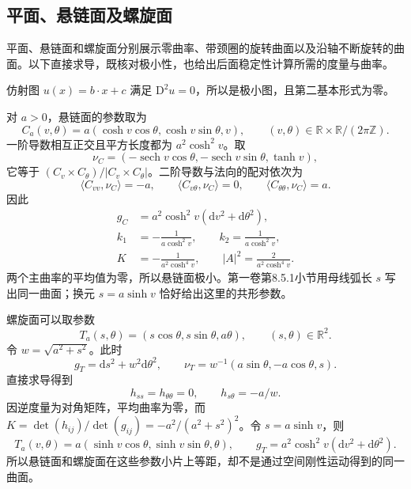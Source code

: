 \subsection{平面、悬链面及螺旋面}
\label{g3:subsec:1902:03}
平面、悬链面和螺旋面分别展示零曲率、带颈圈的旋转曲面以及沿轴不断旋转的曲面。以下直接求导，既核对极小性，也给出后面稳定性计算所需的度量与曲率。

\begin{example}\label{g3:exm:minimal-plane-catenoid-helicoid}
	仿射图 \(u(x)=b\cdot x+c\) 满足 \(\mathrm D^2u=0\)，所以是极小图，且第二基本形式为零。

	对 \(a>0\)，悬链面的参数取为
	\begin{equation}\label{g3:eq:catenoid-conformal-model}
		C_a(v,\theta)
		=a(\cosh v\cos\theta,\cosh v\sin\theta,v),
		\qquad(v,\theta)\in\mathbb R\times\mathbb R/(2\pi\mathbb Z).
	\end{equation}
	一阶导数相互正交且平方长度都为 \(a^2\cosh^2v\)。取
	\[
		\nu_C=(-\operatorname{sech}v\cos\theta,
		-\operatorname{sech}v\sin\theta,\tanh v),
	\]
	它等于 \((C_v\times C_\theta)/|C_v\times C_\theta|\)。二阶导数与法向的配对依次为
	\[
		\langle C_{vv},\nu_C\rangle=-a,\qquad
		\langle C_{v\theta},\nu_C\rangle=0,\qquad
		\langle C_{\theta\theta},\nu_C\rangle=a.
	\]
	因此
	\begin{equation}\label{g3:eq:catenoid-curvature-model}
		\begin{aligned}
		g_C&=a^2\cosh^2v(\mathrm dv^2+\mathrm d\theta^2),\\
		k_1&=-\frac1{a\cosh^2v},\qquad k_2=\frac1{a\cosh^2v},\\
		K&=-\frac1{a^2\cosh^4v},\qquad |A|^2=\frac2{a^2\cosh^4v}.
		\end{aligned}
	\end{equation}
	两个主曲率的平均值为零，所以悬链面极小。第一卷第8.5.1小节用母线弧长 \(s\) 写出同一曲面；换元 \(s=a\sinh v\) 恰好给出这里的共形参数。

	螺旋面可以取参数
	\begin{equation}\label{g3:eq:helicoid-model}
		T_a(s,\theta)=(s\cos\theta,s\sin\theta,a\theta),
		\qquad(s,\theta)\in\mathbb R^2.
	\end{equation}
	令 \(w=\sqrt{a^2+s^2}\)。此时
	\[
		g_T=\mathrm ds^2+w^2\mathrm d\theta^2,\qquad
		\nu_T=w^{-1}(a\sin\theta,-a\cos\theta,s).
	\]
	直接求导得到
	\[
		h_{ss}=h_{\theta\theta}=0,\qquad h_{s\theta}=-a/w.
	\]
	因逆度量为对角矩阵，平均曲率为零，而
	\(K=\det(h_{ij})/\det(g_{ij})=-a^2/(a^2+s^2)^2\)。令 \(s=a\sinh v\)，则
	\[
		T_a(v,\theta)=a(\sinh v\cos\theta,\sinh v\sin\theta,\theta),\qquad
		g_T=a^2\cosh^2v(\mathrm dv^2+\mathrm d\theta^2).
	\]
	所以悬链面和螺旋面在这些参数小片上等距，却不是通过空间刚性运动得到的同一曲面。
\end{example}

